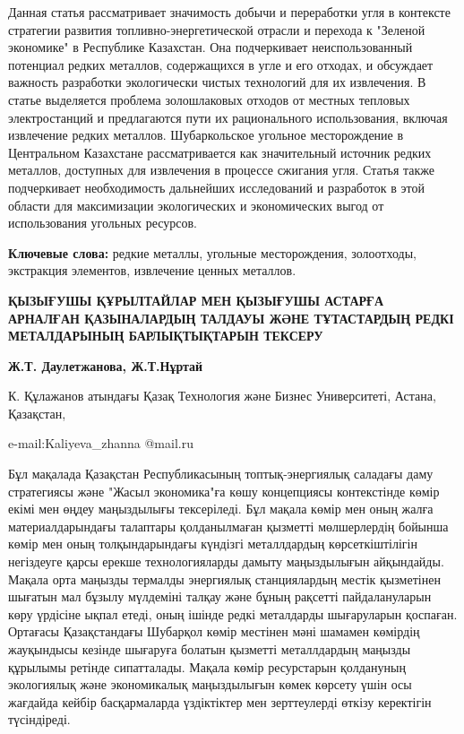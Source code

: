 Данная статья рассматривает значимость добычи и переработки угля в
контексте стратегии развития топливно-энергетической отрасли и перехода
к "Зеленой экономике" в Республике Казахстан. Она подчеркивает
неиспользованный потенциал редких металлов, содержащихся в угле и его
отходах, и обсуждает важность разработки экологически чистых технологий
для их извлечения. В статье выделяется проблема золошлаковых отходов от
местных тепловых электростанций и предлагаются пути их рационального
использования, включая извлечение редких металлов. Шубаркольское
угольное месторождение в Центральном Казахстане рассматривается как
значительный источник редких металлов, доступных для извлечения в
процессе сжигания угля. Статья также подчеркивает необходимость
дальнейших исследований и разработок в этой области для максимизации
экологических и экономических выгод от использования угольных ресурсов.

{\bfseries Ключевые слова:} редкие металлы, угольные месторождения,
золоотходы, экстракция элементов, извлечение ценных металлов.

\begin{center}
{\large\bfseries ҚЫЗЫҒУШЫ ҚҰРЫЛТАЙЛАР МЕН ҚЫЗЫҒУШЫ АСТАРҒА АРНАЛҒАН ҚАЗЫНАЛАРДЫҢ
ТАЛДАУЫ ЖӘНЕ ТҰТАСТАРДЫҢ РЕДКІ МЕТАЛДАРЫНЫҢ БАРЛЫҚТЫҚТАРЫН ТЕКСЕРУ}

{\bfseries Ж.Т. Даулетжанова\envelope, Ж.Т.Нұртай}

К. Құлажанов атындағы Қазақ Технология және Бизнес Университеті, Астана,
Қазақстан,

e-mail:Kaliyeva\_zhanna @mail.ru
\end{center}

Бұл мақалада Қазақстан Республикасының топтық-энергиялық саладағы даму
стратегиясы және "Жасыл экономика"ға көшу концепциясы контекстінде көмір
екімі мен өңдеу маңыздылығы тексеріледі. Бұл мақала көмір мен оның жалға
материалдарындағы талаптары қолданылмаған қызметті мөлшерлердің бойынша
көмір мен оның толқындарындағы күндізгі металлдардың көрсеткіштілігін
негіздеуге қарсы ерекше технологияларды дамыту маңыздылығын айқындайды.
Мақала орта маңызды термалды энергиялық станциялардың местік қызметінен
шығатын мал бұзылу мүлдеміні талқау және бұның рақсетті пайдалануларын
көру үрдісіне ықпал етеді, оның ішінде редкі металдарды шығаруларын
қоспаған. Ортағасы Қазақстандағы Шубарқол көмір местінен мәні шамамен
көмірдің жауқындысы кезінде шығаруға болатын қызметті металлдардың
маңызды құрылымы ретінде сипатталады. Мақала көмір ресурстарын
қолдануның экологиялық және экономикалық маңыздылығын көмек көрсету үшін
осы жағдайда кейбір басқармаларда үздіктіктер мен зерттеулерді өткізу
керектігін түсіндіреді.

